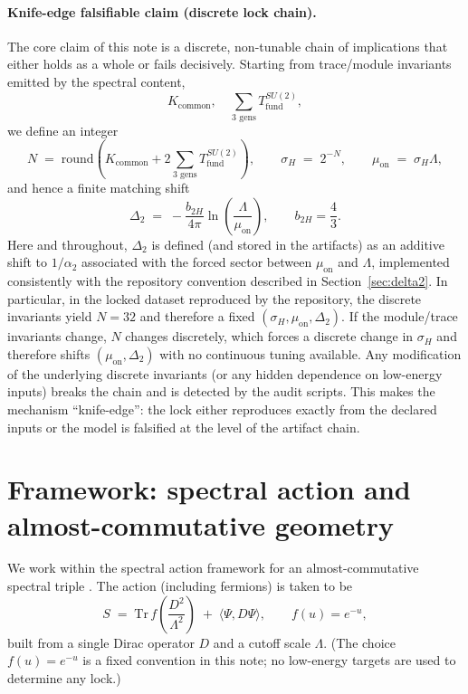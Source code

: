 \documentclass[11pt]{article}
\begin{document}
\paragraph{Knife-edge falsifiable claim (discrete lock chain).}
The core claim of this note is a discrete, non-tunable chain of implications that either holds as a whole or fails decisively. Starting from trace/module invariants emitted by the spectral content,
\begin{equation}
K_{\mathrm{common}},\quad \sum_{\text{3 gens}} T_{\mathrm{fund}}^{SU(2)},
\end{equation}
we define an integer
\begin{equation}
N \;=\; \mathrm{round}\!\left(K_{\mathrm{common}} + 2\sum_{\text{3 gens}} T_{\mathrm{fund}}^{SU(2)}\right),
\qquad
\sigma_H \;=\; 2^{-N},
\qquad
\mu_{\mathrm{on}} \;=\; \sigma_H \Lambda,
\end{equation}
and hence a finite matching shift
\begin{equation}
\Delta_2 \;=\; -\frac{b_{2H}}{4\pi}\ln\!\left(\frac{\Lambda}{\mu_{\mathrm{on}}}\right),
\qquad b_{2H}=\frac{4}{3}.
\end{equation}
Here and throughout, $\Delta_2$ is defined (and stored in the artifacts) as an additive shift to $1/\alpha_2$ associated with the forced sector between $\mu_{\mathrm{on}}$ and $\Lambda$, implemented consistently with the repository convention described in Section~\ref{sec:delta2}. In particular, in the locked dataset reproduced by the repository, the discrete invariants yield $N=32$ and therefore a fixed $(\sigma_H,\mu_{\mathrm{on}},\Delta_2)$. If the module/trace invariants change, $N$ changes discretely, which forces a discrete change in $\sigma_H$ and therefore shifts $(\mu_{\mathrm{on}},\Delta_2)$ with no continuous tuning available. Any modification of the underlying discrete invariants (or any hidden dependence on low-energy inputs) breaks the chain and is detected by the audit scripts. This makes the mechanism ``knife-edge'': the lock either reproduces exactly from the declared inputs or the model is falsified at the level of the artifact chain.

\section{Framework: spectral action and almost-commutative geometry}
We work within the spectral action framework for an almost-commutative spectral triple \cite{ChamseddineConnes1996,ChamseddineConnes1997}.  The action (including fermions) is taken to be
\begin{equation}
S \;=\; \mathrm{Tr}\, f\!\left(\frac{D^2}{\Lambda^2}\right) \;+\; \langle \Psi, D\Psi\rangle,
\qquad f(u)=e^{-u},
\end{equation}
built from a single Dirac operator $D$ and a cutoff scale $\Lambda$.  (The choice $f(u)=e^{-u}$ is a fixed convention in this note; no low-energy targets are used to determine any lock.)
\end{document}
